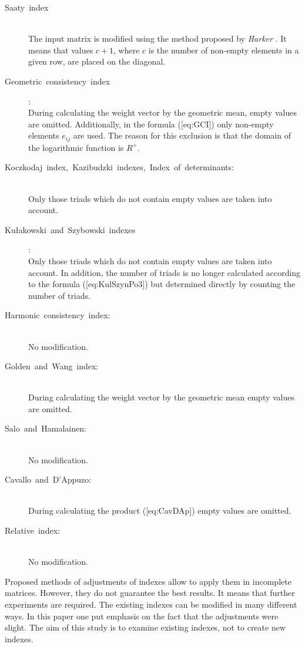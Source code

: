 \begin{description}

\item[Saaty index] \hfill \\ 
	The input matrix is modified using the method proposed by \textit{Harker} \cite{HARKER1987}. It means that values $c+1$, where $c$ is the number of non-empty elements in a given row, are placed on the diagonal.

\item[Geometric consistency index]: \hfill \\
	During calculating the weight vector by the geometric mean, empty values are omitted. Additionally, in the formula ([eq:GCI]) only non-empty elements $e_{ij}$ are used. The reason for this exclusion is that the domain of the logarithmic function is $R^{+}$.

\item[Koczkodaj index, Kazibudzki indexes, Index of determinants:] \hfill \\ 
  Only those triads which do not contain empty values are taken into account.

\item[Kułakowski and Szybowski indexes]: \hfill \\ 
	Only those triads which do not contain empty values are taken into account. In addition, the number of triads is no longer calculated according to the formula ([eq:KulSzynPo3]) but determined directly by counting the number of triads.

\item[Harmonic consistency index:] \hfill \\ 
  No modification.

\item[Golden and Wang index:] \hfill \\ 
  During calculating the weight vector by the geometric mean empty values are omitted.

\item[Salo and Hamalainen:] \hfill \\ 
  No modification.

\item[Cavallo and D'Appuzo:] \hfill \\
	During calculating the product ([eq:CavDAp]) empty values are omitted.

\item[Relative index:] \hfill \\ 
  No modification.
\end{description}

Proposed methods of adjustments of indexes allow to apply them in incomplete matrices. However, they do not guarantee the best results. It means that further experiments are required. The existing indexes can be modified in many different ways. In this paper one put emphasis on the fact that the adjustments were slight. The aim of this study is to examine existing indexes, not to create new indexes.